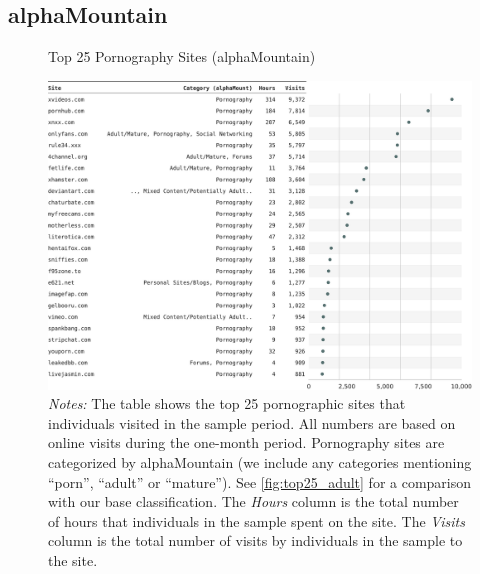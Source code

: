 \documentclass[12pt, letterpaper]{article}
\begin{document}
\subsection{alphaMountain}
\begin{figure}[ht]
	\centering
	\caption{Top 25 Pornography Sites (alphaMountain)}
	\includegraphics[width=\textwidth]{figs/top_25_adultsites_alphamountain.pdf}
	\caption*{\footnotesize \emph{Notes:} 
		The table shows the top 25 pornographic sites that individuals visited in the sample period.
            All numbers are based on online visits during the one-month period.
		Pornography sites are categorized by alphaMountain (we include any categories mentioning ``porn'', ``adult'' or ``mature'').
            See \cref{fig:top25_adult} for a comparison with our base classification.
    	The \emph{Hours} column is the total number of hours that individuals in the sample spent on the site. 
    	The \emph{Visits} column is the total number of visits by individuals in the sample to the site.            
	}
	\label{fig:top25_adult_alphamountain}
\end{figure}




\end{document}
